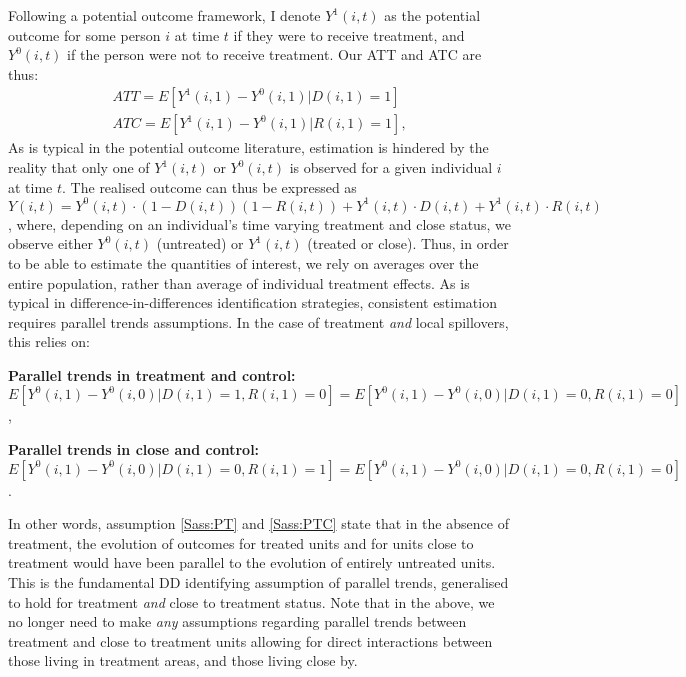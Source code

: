 Following a potential outcome framework, I denote $Y^1(i,t)$ as the potential
outcome for some person $i$ at time $t$ if they were to receive treatment, and
$Y^0(i,t)$ if the person were not to receive treatment.  Our ATT and ATC are
thus:
\begin{eqnarray}
\label{Seqn:estimATT}
ATT=E[Y^1(i,1)-Y^0(i,1)|D(i,1)=1]\  \\
\label{Seqn:estimATC}
ATC=E[Y^1(i,1)-Y^0(i,1)|R(i,1)=1],
\end{eqnarray}
As is typical in the potential outcome literature, estimation is hindered by the
reality that only one of $Y^1(i,t)$ or $Y^0(i,t)$ is observed for a given 
individual $i$ at time $t$.  The realised outcome can thus be expressed as 
$Y(i,t)=Y^0(i,t)\cdot (1-D(i,t))(1-R(i,t))+Y^1(i,t)\cdot D(i,t)+Y^1(i,t)\cdot 
R(i,t)$, where, depending on an individual's time varying treatment and close
status, we observe either $Y^0(i,t)$ (untreated) or $Y^1(i,t)$ (treated or 
close).  Thus, in order to be able to estimate the quantities of interest, we 
rely on averages over the entire population, rather than average of individual 
treatment effects.  As is typical in difference-in-differences identification
strategies, consistent estimation requires parallel trends assumptions.  In the 
case of treatment \emph{and} local spillovers, this relies on:

\begin{assumption}{1}{}
\label{Sass:PT}
\textbf{Parallel trends in treatment and control:} \\
$E[Y^0(i,1)-Y^0(i,0)|D(i,1)=1,R(i,1)=0]=
E[Y^0(i,1)-Y^0(i,0)|D(i,1)=0,R(i,1)=0]$,
\end{assumption}
\begin{assumption}{2}{}
\label{Sass:PTC}
\textbf{Parallel trends in close and control:} \\
$E[Y^0(i,1)-Y^0(i,0)|D(i,1)=0,R(i,1)=1]=
E[Y^0(i,1)-Y^0(i,0)|D(i,1)=0,R(i,1)=0]$.
\end{assumption}

In other words, assumption \ref{Sass:PT} and \ref{Sass:PTC} state that in the 
absence of treatment, the evolution of outcomes for treated units and for units 
close to treatment would have been parallel to the evolution of entirely 
untreated units.  This is the fundamental DD identifying assumption of parallel 
trends, generalised to hold for treatment \emph{and} close to treatment status.  
Note that in the above, we no longer need to make \emph{any} assumptions 
regarding parallel trends between treatment and close to treatment units 
allowing for direct interactions between those living in treatment areas, and
those living close by.

